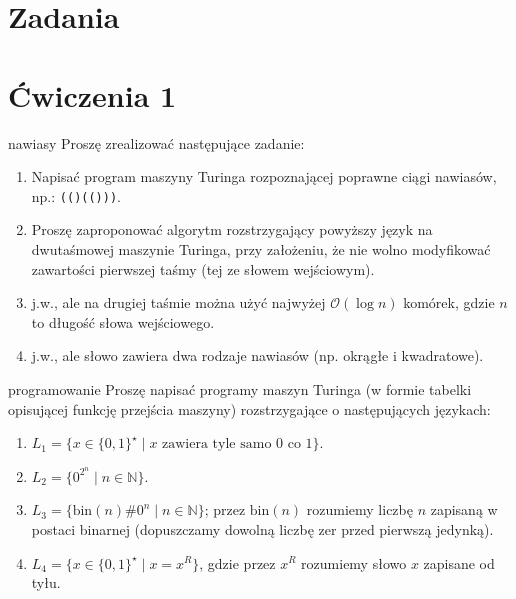 \section*{Zadania}


\section{Ćwiczenia 1}

\begin{exercise}{nawiasy}
Proszę zrealizować następujące zadanie:
\begin{enumerate}[label=(\alph*)]
    \item Napisać program maszyny Turinga rozpoznającej poprawne ciągi nawiasów, np.: \texttt{(()(()))}.
    
    \item Proszę zaproponować algorytm rozstrzygający powyższy język na dwutaśmowej maszynie Turinga, przy założeniu, że nie wolno modyfikować zawartości pierwszej taśmy (tej ze słowem wejściowym).
    
    \item j.w., ale na drugiej taśmie można użyć najwyżej $\mathcal{O}(\log n)$ komórek, gdzie $n$ to długość słowa wejściowego.
    
    \item j.w., ale słowo zawiera dwa rodzaje nawiasów (np. okrągłe i kwadratowe).
\end{enumerate}
\end{exercise}

\begin{exercise}{programowanie}
Proszę napisać programy maszyn Turinga (w formie tabelki opisującej funkcję przejścia maszyny) rozstrzygające o następujących językach:

\begin{enumerate}[label=(\alph*)]
    \item $L_1 = \{x \in \{0,1\}^\star \mid x \text{ zawiera tyle samo 0 co 1}\}$.
    
    \item $L_2 = \{0^{2^n} \mid n \in \mathbb{N}\}$.
    
    \item $L_3 = \{\text{bin}(n)\#0^n \mid n \in \mathbb{N}\}$; przez $\text{bin}(n)$ rozumiemy liczbę $n$ zapisaną w postaci binarnej (dopuszczamy dowolną liczbę zer przed pierwszą jedynką).
    
    \item $L_4 = \{x \in \{0,1\}^\star \mid x = x^R\}$, gdzie przez $x^R$ rozumiemy słowo $x$ zapisane od tyłu.
\end{enumerate}
\end{exercise}

